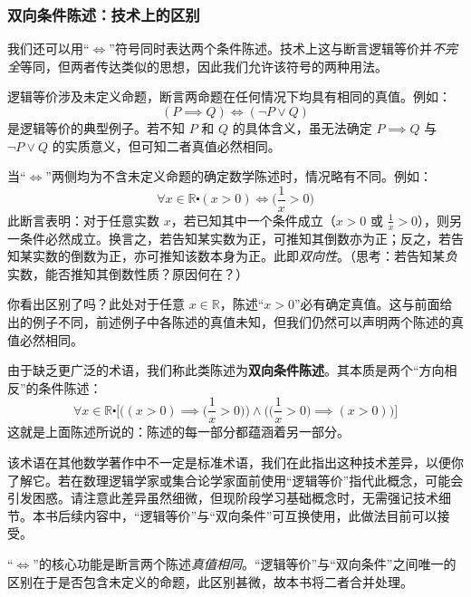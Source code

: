 \subsubsection*{双向条件陈述：技术上的区别}

我们还可以用``$\iff$''符号同时表达两个条件陈述。技术上这与断言逻辑等价并\emph{不完全}等同，但两者传达类似的思想，因此我们允许该符号的两种用法。

逻辑等价涉及未定义命题，断言两命题在任何情况下均具有相同的真值。例如：
\[(P \implies Q) \iff (\neg P \lor Q)\]
是逻辑等价的典型例子。若不知 $P$ 和 $Q$ 的具体含义，虽无法确定 $P \implies Q$ 与 $\neg P \lor Q$ 的实质意义，但可知二者真值必然相同。

当``$\iff$''两侧均为不含未定义命题的确定数学陈述时，情况略有不同。例如：
\[\forall x \in \mathbb{R} \centerdot (x > 0) \iff \Big(\frac{1}{x}>0\Big)\]
此断言表明：对于任意实数 $x$，若已知其中一个条件成立（$x > 0$ 或 $\frac{1}{x} > 0$），则另一条件必然成立。换言之，若告知某实数为正，可推知其倒数亦为正；反之，若告知某实数的倒数为正，亦可推知该数本身为正。此即\emph{双向性}。（思考：若告知某\emph{负}实数，能否推知其倒数性质？原因何在？）

你看出区别了吗？此处对于任意 $x \in \mathbb{R}$，陈述``$x > 0$''必有确定真值。这与前面给出的例子不同，前述例子中各陈述的真值未知，但我们仍然可以声明两个陈述的真值必然相同。

由于缺乏更广泛的术语，我们称此类陈述为\textbf{双向条件陈述}。其本质是两个``方向相反''的条件陈述：
\[\forall x \in \mathbb{R} \centerdot \Bigg[\Bigg((x > 0) \implies \Big(\frac{1}{x}>0\Big)\Bigg) \land \Bigg(\Big(\frac{1}{x}>0\Big) \implies (x > 0)\Bigg)\Bigg]\]
这就是上面陈述所说的：陈述的每一部分都蕴涵着另一部分。

该术语在其他数学著作中不一定是标准术语，我们在此指出这种技术差异，以便你了解它。若在数理逻辑学家或集合论学家面前使用``逻辑等价''指代此概念，可能会引发困惑。请注意此差异虽然细微，但现阶段学习基础概念时，无需强记技术细节。本书后续内容中，``逻辑等价''与``双向条件''可互换使用，此做法目前可以接受。

``$\iff$''的核心功能是断言两个陈述\emph{真值相同}。``逻辑等价''与``双向条件''之间唯一的区别在于是否包含未定义的命题，此区别甚微，故本书将二者合并处理。
